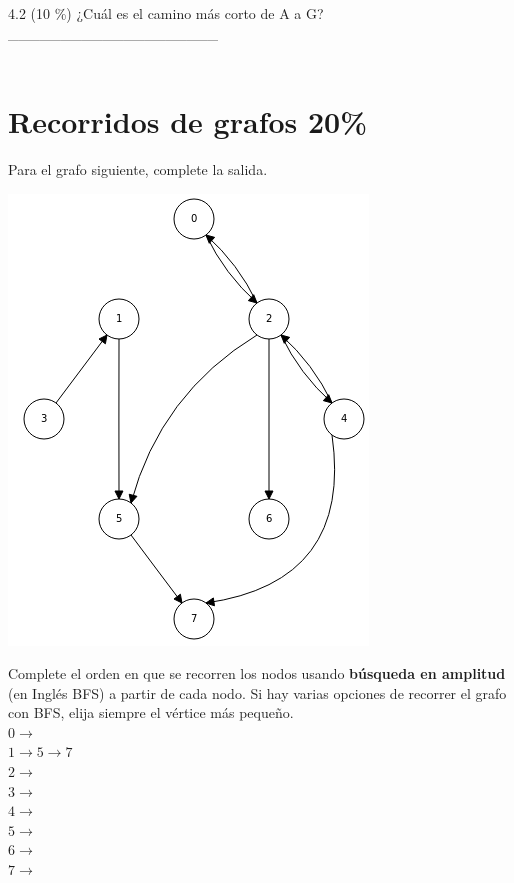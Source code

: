 \documentclass[twocolumn]{article}
\begin{document}
4.2 (10 \%) ¿Cuál es el camino más corto de A a G?\\

  \_\_\_\_\_\_\_\_\_\_\_\_\_\_\_\_\_\_\_\_
\\
\\

\section{Recorridos de grafos 20\%}

Para el grafo siguiente, complete la salida.

\begin{center}
\includegraphics[scale=0.5]{grafin.png}
\end{center}

Complete el orden en que se recorren los nodos usando \textbf{búsqueda en amplitud} (en Inglés BFS) a partir de cada nodo. Si hay varias opciones de recorrer el grafo con BFS, elija siempre el vértice más pequeño.\\


\noindent
$0 \rightarrow$\\
$1 \rightarrow 5 \rightarrow  7$\\
$2 \rightarrow$\\
$3 \rightarrow$\\
$4 \rightarrow$\\
$5 \rightarrow$\\
$6 \rightarrow$\\
$7 \rightarrow$\\
\end{document}
